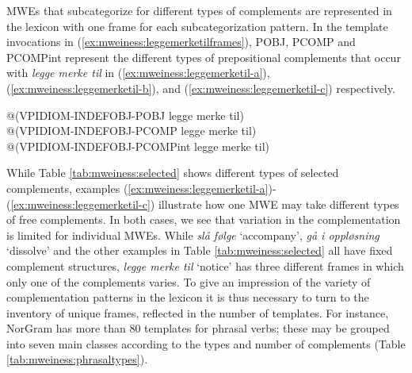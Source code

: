 \documentclass[output=paper]{langsci/langscibook}
\begin{document}
MWEs that subcategorize for different types of complements are represented in the lexicon with one frame for each subcategorization pattern.
In the template invocations in (\ref{ex:mweiness:leggemerketilframes}), POBJ, PCOMP and PCOMPint represent the different types of prepositional complements that occur with \emph{legge merke til} in (\ref{ex:mweiness:leggemerketil-a}), (\ref{ex:mweiness:leggemerketil-b}), and (\ref{ex:mweiness:leggemerketil-c}) respectively.
	
\ea\label{ex:mweiness:leggemerketilframes}
\begin{xlist}
\ex \label{ex:mweiness:leggemerketilframes-a}@(VPIDIOM-INDEFOBJ-POBJ legge merke til) \\ 
\ex \label{ex:mweiness:leggemerketilframes-b}@(VPIDIOM-INDEFOBJ-PCOMP  legge merke til) \\
\ex \label{ex:mweiness:leggemerketilframes-c}@(VPIDIOM-INDEFOBJ-PCOMPint legge merke til) \\
\end{xlist}
\z	


While Table \ref{tab:mweiness:selected} shows different types of selected complements, examples (\ref{ex:mweiness:leggemerketil-a})-(\ref{ex:mweiness:leggemerketil-c}) illustrate how one MWE may take different types of free complements.
In both cases, we see that variation in the complementation is limited for individual MWEs.
While \emph{slå følge} `accompany', \emph{gå i oppløsning} `dissolve' and the other examples in Table \ref{tab:mweiness:selected} all have fixed complement structures, \emph{legge merke til} `notice' has three different frames in which only one of the complements varies.
To give an impression of the variety of complementation patterns in the lexicon it is thus necessary to turn to the inventory of unique frames, reflected in the number of templates.
For instance, NorGram has more than 80 templates for phrasal verbs; these may be grouped into seven main classes according to the types and number of complements (Table \ref{tab:mweiness:phrasaltypes}). %
\end{document}
